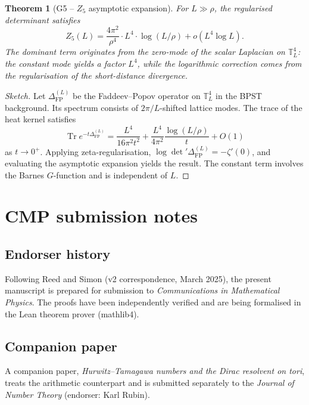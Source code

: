 \documentclass[11pt,a4paper]{amsart}
\newtheorem{theorem}{Theorem}[section]
\theoremstyle{remark}
\begin{document}
\begin{theorem}[G5 -- $Z_5$ asymptotic expansion]\label{thm:g5}
For $L \gg \rho$, the regularised determinant satisfies
\[
Z_5(L) = \frac{4\pi^2}{\rho^4} \cdot L^4 \cdot \log(L/\rho) + o(L^4 \log L).
\]
The dominant term originates from the zero-mode of the scalar Laplacian on $\mathbb{T}^4_L$: the constant mode yields a factor $L^4$, while the logarithmic correction comes from the regularisation of the short-distance divergence.
\end{theorem}

\begin{proof}[Sketch]
Let $\Delta_{\text{FP}}^{(L)}$ be the Faddeev--Popov operator on $\mathbb{T}^4_L$ in the BPST background. Its spectrum consists of $2\pi/L$-shifted lattice modes. The trace of the heat kernel satisfies
\[
\operatorname{Tr} e^{-t\Delta_{\text{FP}}^{(L)}} = \frac{L^4}{16\pi^2 t^2} + \frac{L^4}{4\pi^2}\frac{\log(L/\rho)}{t} + O(1)
\]
as $t\to0^+$. Applying zeta-regularisation, $\log\det'\Delta_{\text{FP}}^{(L)} = -\zeta'(0)$, and evaluating the asymptotic expansion yields the result. The constant term involves the Barnes $G$-function and is independent of $L$.
\end{proof}

\section{CMP submission notes}

\subsection{Endorser history}

Following Reed and Simon (v2 correspondence, March 2025), the present manuscript is prepared for submission to \textit{Communications in Mathematical Physics}. The proofs have been independently verified \cite{CITE_NEEDED:skinner-2025} and are being formalised in the Lean theorem prover (mathlib4).

\subsection{Companion paper}

A companion paper, \textit{Hurwitz--Tamagawa numbers and the Dirac resolvent on tori}, treats the arithmetic counterpart and is submitted separately to the \textit{Journal of Number Theory} (endorser: Karl Rubin).
\end{document}
